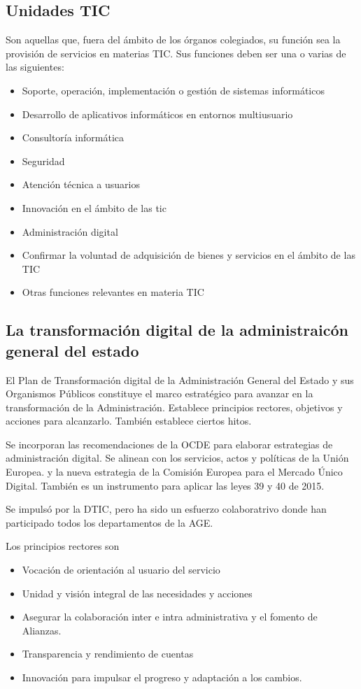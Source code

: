     \subsection{Unidades TIC}
        Son aquellas que, fuera del ámbito de los órganos colegiados, su función sea la provisión de servicios en materias TIC. Sus funciones deben ser una o varias de las siguientes:
        \begin{itemize}
            \item Soporte, operación, implementación o gestión de sistemas informáticos
            \item Desarrollo de aplicativos informáticos en entornos multiusuario
            \item Consultoría informática
            \item Seguridad
            \item Atención técnica a usuarios
            \item Innovación en el ámbito de las tic
            \item Administración digital
            \item Confirmar la voluntad de adquisición de bienes y servicios en el ámbito de las TIC
            \item Otras funciones relevantes en materia TIC
        \end{itemize}

\subsection{La transformación digital de la administraicón general del estado}
    El Plan de Transformación digital de la Administración General del Estado y sus Organismos Públicos constituye el marco estratégico para avanzar en la transformación de la Administración. Establece principios rectores, objetivos y acciones para alcanzarlo. También establece ciertos hitos.

    Se incorporan las recomendaciones de la OCDE para elaborar estrategias de administración digital. Se alinean con los servicios, actos y políticas de la Unión Europea.  y la nueva estrategia de la Comisión Europea para el Mercado Único Digital. También es un instrumento para aplicar las leyes 39 y 40 de 2015.

    Se impulsó por la DTIC, pero ha sido un esfuerzo colaboratrivo donde han participado todos los departamentos de la AGE.

    Los principios rectores son
    \begin{itemize}
        \item Vocación de orientación al usuario del servicio
        \item Unidad y visión integral de las necesidades y acciones
        \item Asegurar la colaboración inter e intra administrativa y el fomento de Alianzas. 
        \item Transparencia y rendimiento de cuentas
        \item Innovación para impulsar el progreso y adaptación a los cambios.
    \end{itemize}

